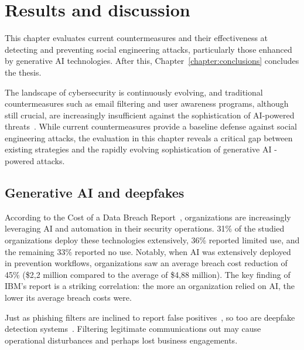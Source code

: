 
\chapter{Results and discussion\label{chapter:discussion}}
\begin{comment}
\end{comment}

This chapter evaluates current countermeasures and their effectiveness at detecting and preventing social engineering attacks, particularly those enhanced by generative AI technologies. After this, Chapter~\ref{chapter:conclusions} concludes the thesis.

The landscape of cybersecurity is continuously evolving, and traditional countermeasures such as email filtering and user awareness programs, although still crucial, are increasingly insufficient against the sophistication of AI-powered threats~\citep{fakhouri_AI_Driven_Solutions_SE_Attacks_2024}. While current countermeasures provide a baseline defense against social engineering attacks, the evaluation in this chapter reveals a critical gap between existing strategies and the rapidly evolving sophistication of generative AI -powered attacks. 


\section{Generative AI and deepfakes}
\begin{comment}
\end{comment}

According to the Cost of a Data Breach Report~\citep{ibm_Cost_Data_Breach_Report_2024}, organizations are increasingly leveraging AI and automation in their security operations. 31\% of the studied organizations deploy these technologies extensively, 36\% reported limited use, and the remaining 33\% reported no use. Notably, when AI was extensively deployed in prevention workflows, organizations saw an average breach cost reduction of 45\% (\$2,2 million compared to the average of \$4,88 million). The key finding of IBM's report is a striking correlation: the more an organization relied on AI, the lower its average breach costs were.

Just as phishing filters are inclined to report false positives~\citep{fakhouri_AI_Driven_Solutions_SE_Attacks_2024}, so too are deepfake detection systems~\citep{mirsky_Creation_Detection_Deepfakes_2021}. Filtering legitimate communications out may cause operational disturbances and perhaps lost business engagements.

